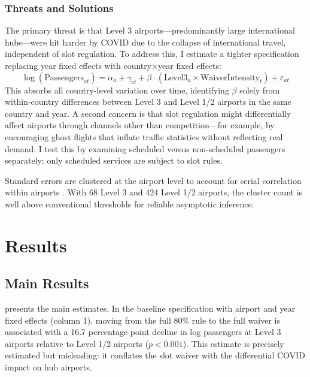 \documentclass[12pt]{article}
\begin{document}
\subsubsection*{Threats and Solutions} The primary threat is that Level 3 airports---predominantly large international hubs---were hit harder by COVID due to the collapse of international travel, independent of slot regulation. To address this, I estimate a tighter specification replacing year fixed effects with country$\times$year fixed effects:
\begin{equation}
\log(\text{Passengers}_{at}) = \alpha_a + \gamma_{ct} + \beta \cdot (\text{Level3}_a \times \text{WaiverIntensity}_t) + \varepsilon_{at}
\label{eq:within}
\end{equation}
This absorbs all country-level variation over time, identifying $\beta$ solely from within-country differences between Level 3 and Level 1/2 airports in the same country and year. A second concern is that slot regulation might differentially affect airports through channels other than competition---for example, by encouraging ghost flights that inflate traffic statistics without reflecting real demand. I test this by examining scheduled versus non-scheduled passengers separately: only scheduled services are subject to slot rules.

Standard errors are clustered at the airport level to account for serial correlation within airports \citep{bertrand2004}. With 68 Level 3 and 424 Level 1/2 airports, the cluster count is well above conventional thresholds for reliable asymptotic inference.

\section{Results}



\subsection{Main Results}

 presents the main estimates. In the baseline specification with airport and year fixed effects (column 1), moving from the full 80\% rule to the full waiver is associated with a 16.7 percentage point decline in log passengers at Level 3 airports relative to Level 1/2 airports ($p < 0.001$). This estimate is precisely estimated but misleading: it conflates the slot waiver with the differential COVID impact on hub airports.
\end{document}
